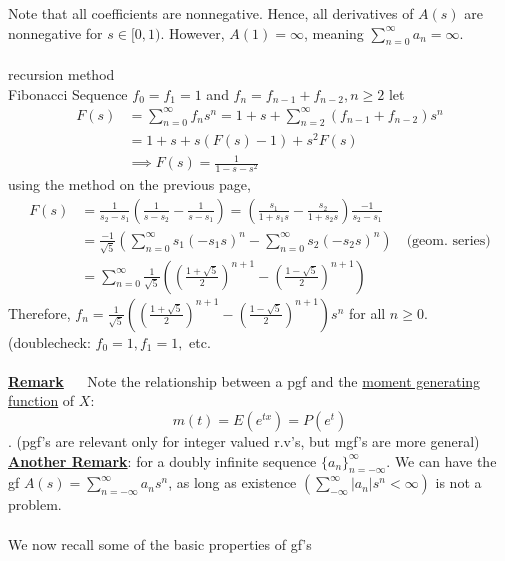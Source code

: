 \documentclass[12pt]{article}
\theoremstyle{definition}
\theoremstyle{plain}
\begin{document}
Note that all coefficients are nonnegative. Hence, all derivatives of $A(s)$ are nonnegative for $s\in [0,1)$. However, $A(1)=\infty$, meaning $\sum_{n=0}^\infty a_n = \infty$.\\ \\
recursion method \\
Fibonacci Sequence $f_0 = f_1 = 1$ and $f_n = f_{n-1} + f_{n-2}, n \geq 2$ let 
\begin{displaymath}
\begin{aligned}
F(s) &= \sum_{n=0}^{\infty} f_n s^n = 1 + s + \sum_{n=2}^\infty (f_{n-1} + f_{n-2})s^n \\
      &= 1 + s + s(F(s) - 1) + s^2F(s)\\
      & \implies F(s) = \frac{1}{1-s-s^2}
\end{aligned}
\end{displaymath}
using the method on the previous page,
\begin{displaymath}
\begin{aligned}
F(s) &= \frac{1}{s_2 - s_1} (\frac{1}{s - s_2} - \frac{1}{s - s_1}) = (\frac{s_1}{1 + s_1 s} - \frac{s_2}{1 + s_2 s})\frac{-1}{s_2 - s_1} \\
&= \frac{-1}{\sqrt{5}}(\sum_{n=0}^\infty s_1 (-s_1 s)^n - \sum_{n=0}^\infty s_2 (-s_2 s)^n) \quad \mbox{(geom. series)} \\
&= \sum_{n=0}^\infty \frac{1}{\sqrt{5}}((\frac{1+\sqrt{5}}{2})^{n+1} - (\frac{1-\sqrt{5}}{2})^{n+1})
\end{aligned}
\end{displaymath}
Therefore, $f_n = \frac{1}{\sqrt{5}}((\frac{1 + \sqrt{5}}{2})^{n+1} - (\frac{1-\sqrt{5}}{2})^{n+1})s^n$ for all $n \geq 0$. (doublecheck: $f_0 = 1, f_1=1,$ etc.\\ \\
\underline{\textbf{Remark}} $\quad$ Note the relationship between a pgf and the \underline{moment generating function} of $X$: \[m(t) = E(e^{tx}) = P(e^t)\]. (pgf's are relevant only for integer valued r.v's, but mgf's are more general) \\
\underline{\textbf{Another Remark}}: for a doubly infinite sequence $\{a_n\}_{n=-\infty}^\infty$. We can have the gf $A(s)=\sum_{n=-\infty}^\infty a_n s^n$, as long as existence $(\sum_{-\infty}^\infty |a_n| s^n < \infty)$ is not a problem. \\ \\
We now recall some of the basic properties of gf's
\end{document}
